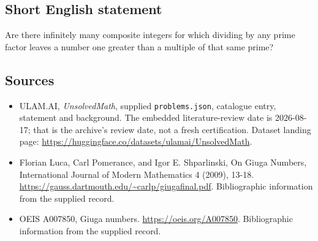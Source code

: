 \documentclass[11pt,a4paper]{article}
\begin{document}
\subsection{Short English statement}

Are there infinitely many composite integers for which dividing by any prime factor leaves a number one greater than a multiple of that same prime?

\subsection{Sources}

{\small

\begin{itemize}

\item[\hypertarget{source:statement:1}{S1}] ULAM.AI, \emph{UnsolvedMath}, supplied \texttt{problems.json}, catalogue entry, statement and background. The embedded literature-review date is 2026-08-17; that is the archive’s review date, not a fresh certification. Dataset landing page: \url{https://huggingface.co/datasets/ulamai/UnsolvedMath}.

\item[\hypertarget{source:statement:2}{S2}] Florian Luca, Carl Pomerance, and Igor E. Shparlinski, On Giuga Numbers, International Journal of Modern Mathematics 4 (2009), 13-18. \url{https://gauss.dartmouth.edu/~carlp/giugafinal.pdf}. Bibliographic information from the supplied record.

\item[\hypertarget{source:statement:3}{S3}] OEIS A007850, Giuga numbers. \url{https://oeis.org/A007850}. Bibliographic information from the supplied record.

\end{itemize}

}

\label{end:statement}
\end{document}
